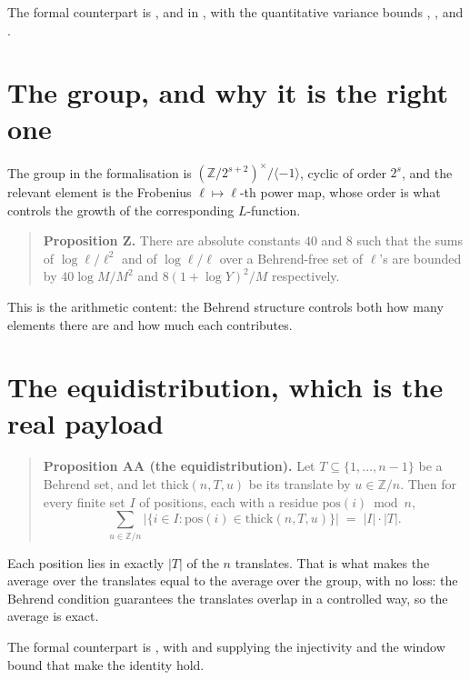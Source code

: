 The formal counterpart is ,  and
 in , with the
quantitative variance bounds , , 
and .

\section{The group, and why it is the right one}The group in the formalisation is
$(\mathbb{Z}/2^{s+2})^\times / \langle -1\rangle$, cyclic of order $2^s$,
and the relevant element is the Frobenius $\ell \mapsto \ell$-th power map,
whose order is what controls the growth of the corresponding $L$-function.

\begin{quote}
\textbf{Proposition Z.} There are absolute constants $40$ and $8$ such that
the sums of $\log \ell / \ell^2$ and of $\log \ell / \ell$ over a Behrend-free
set of $\ell$'s are bounded by $40\log M / M^2$ and $8(1+\log Y)^2/M$
respectively.
\end{quote}

This is the arithmetic content: the Behrend structure controls both how many
elements there are and how much each contributes.

\section{The equidistribution, which is the real payload}\begin{quote}
\textbf{Proposition AA (the equidistribution).} Let $T \subseteq
\{1,\dots,n-1\}$ be a Behrend set, and let $\mathrm{thick}(n,T,u)$ be its
translate by $u \in \mathbb{Z}/n$. Then for every finite set $I$ of
positions, each with a residue $\mathrm{pos}(i) \bmod n$,
\[
\sum_{u \in \mathbb{Z}/n}
\bigl|\{i \in I : \mathrm{pos}(i) \in \mathrm{thick}(n,T,u)\}\bigr|
\;=\; |I| \cdot |T|.
\]
\end{quote}

Each position lies in exactly $|T|$ of the $n$ translates. That is what makes
the average over the translates equal to the average over the group, with no
loss: the Behrend condition guarantees the translates overlap in a controlled
way, so the average is exact.

The formal counterpart is , with  and
 supplying the injectivity and the window bound that make the
identity hold.


